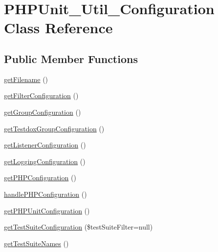 \hypertarget{class_p_h_p_unit___util___configuration}{}\section{P\+H\+P\+Unit\+\_\+\+Util\+\_\+\+Configuration Class Reference}
\label{class_p_h_p_unit___util___configuration}
\subsection*{Public Member Functions}
\begin{DoxyCompactItemize}
\item 
\mbox{\hyperlink{class_p_h_p_unit___util___configuration_a2982abe8d7b767602a1485dfb4cf653d}{get\+Filename}} ()
\item 
\mbox{\hyperlink{class_p_h_p_unit___util___configuration_a4aabf8db7f0c37953e6261128840acbd}{get\+Filter\+Configuration}} ()
\item 
\mbox{\hyperlink{class_p_h_p_unit___util___configuration_afa88979f7ae48c0f0745443305631057}{get\+Group\+Configuration}} ()
\item 
\mbox{\hyperlink{class_p_h_p_unit___util___configuration_af48b04caca08477e6a3128b3712fb562}{get\+Testdox\+Group\+Configuration}} ()
\item 
\mbox{\hyperlink{class_p_h_p_unit___util___configuration_a2339a7df4d6f6bb5f44f10895c68b09a}{get\+Listener\+Configuration}} ()
\item 
\mbox{\hyperlink{class_p_h_p_unit___util___configuration_afd55a7913b3255daa422e20532c65665}{get\+Logging\+Configuration}} ()
\item 
\mbox{\hyperlink{class_p_h_p_unit___util___configuration_ab1293b372b365f8752626d457c46711b}{get\+P\+H\+P\+Configuration}} ()
\item 
\mbox{\hyperlink{class_p_h_p_unit___util___configuration_a22645bd8ed1ef0b6f5ae852c22a75665}{handle\+P\+H\+P\+Configuration}} ()
\item 
\mbox{\hyperlink{class_p_h_p_unit___util___configuration_aa314d2921e739837dbe4e04882402bbb}{get\+P\+H\+P\+Unit\+Configuration}} ()
\item 
\mbox{\hyperlink{class_p_h_p_unit___util___configuration_a8f6c07dc957656f19e0b30afd4ffd932}{get\+Test\+Suite\+Configuration}} (\$test\+Suite\+Filter=null)
\item 
\mbox{\hyperlink{class_p_h_p_unit___util___configuration_a4062eef82ea4fb2ee5368400e8e1829e}{get\+Test\+Suite\+Names}} ()
\end{DoxyCompactItemize}
